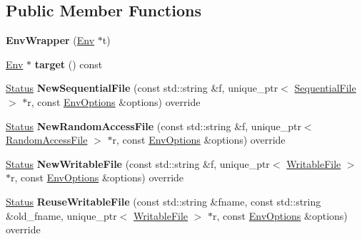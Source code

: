 \subsection*{Public Member Functions}
\begin{DoxyCompactItemize}
\item 
{\bfseries Env\+Wrapper} (\hyperlink{classrocksdb_1_1Env}{Env} $\ast$t)\hypertarget{classrocksdb_1_1EnvWrapper_ae37ae6de8a04752756d14b3d733e6e1e}{}\label{classrocksdb_1_1EnvWrapper_ae37ae6de8a04752756d14b3d733e6e1e}

\item 
\hyperlink{classrocksdb_1_1Env}{Env} $\ast$ {\bfseries target} () const\hypertarget{classrocksdb_1_1EnvWrapper_aefb72ca219c9b933fba9fc572cf84a3f}{}\label{classrocksdb_1_1EnvWrapper_aefb72ca219c9b933fba9fc572cf84a3f}

\item 
\hyperlink{classrocksdb_1_1Status}{Status} {\bfseries New\+Sequential\+File} (const std\+::string \&f, unique\+\_\+ptr$<$ \hyperlink{classrocksdb_1_1SequentialFile}{Sequential\+File} $>$ $\ast$r, const \hyperlink{structrocksdb_1_1EnvOptions}{Env\+Options} \&options) override\hypertarget{classrocksdb_1_1EnvWrapper_a16afc94e7dbb40a9f15d137d6675dc40}{}\label{classrocksdb_1_1EnvWrapper_a16afc94e7dbb40a9f15d137d6675dc40}

\item 
\hyperlink{classrocksdb_1_1Status}{Status} {\bfseries New\+Random\+Access\+File} (const std\+::string \&f, unique\+\_\+ptr$<$ \hyperlink{classrocksdb_1_1RandomAccessFile}{Random\+Access\+File} $>$ $\ast$r, const \hyperlink{structrocksdb_1_1EnvOptions}{Env\+Options} \&options) override\hypertarget{classrocksdb_1_1EnvWrapper_ac24f60f42e2af752e6cec45e958f4408}{}\label{classrocksdb_1_1EnvWrapper_ac24f60f42e2af752e6cec45e958f4408}

\item 
\hyperlink{classrocksdb_1_1Status}{Status} {\bfseries New\+Writable\+File} (const std\+::string \&f, unique\+\_\+ptr$<$ \hyperlink{classrocksdb_1_1WritableFile}{Writable\+File} $>$ $\ast$r, const \hyperlink{structrocksdb_1_1EnvOptions}{Env\+Options} \&options) override\hypertarget{classrocksdb_1_1EnvWrapper_a33a5adf52362df8b3502e4237071b108}{}\label{classrocksdb_1_1EnvWrapper_a33a5adf52362df8b3502e4237071b108}

\item 
\hyperlink{classrocksdb_1_1Status}{Status} {\bfseries Reuse\+Writable\+File} (const std\+::string \&fname, const std\+::string \&old\+\_\+fname, unique\+\_\+ptr$<$ \hyperlink{classrocksdb_1_1WritableFile}{Writable\+File} $>$ $\ast$r, const \hyperlink{structrocksdb_1_1EnvOptions}{Env\+Options} \&options) override\hypertarget{classrocksdb_1_1EnvWrapper_a734526bf94a33e59a3a4f9d973c72642}{}\label{classrocksdb_1_1EnvWrapper_a734526bf94a33e59a3a4f9d973c72642}


\end{DoxyCompactItemize}
